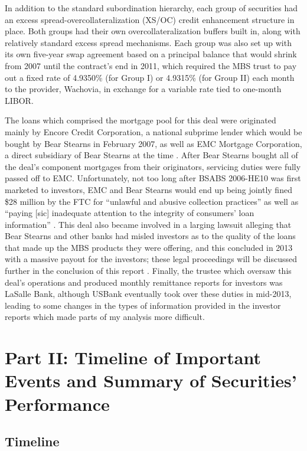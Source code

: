 \documentclass[12pt]{article}
\begin{document}
In addition to the standard subordination hierarchy, each group of securities had an excess spread-overcollateralization (XS/OC) credit enhancement structure in place. Both groups had their own overcollateralization buffers built in, along with relatively standard excess spread mechanisms. Each group was also set up with its own five-year swap agreement based on a principal balance that would shrink from 2007 until the contract’s end in 2011, which required the MBS trust to pay out a fixed rate of 4.9350\% (for Group I) or 4.9315\% (for Group II) each month to the provider, Wachovia, in exchange for a variable rate tied to one-month LIBOR.

The loans which comprised the mortgage pool for this deal were originated mainly by Encore Credit Corporation, a national subprime lender which would be bought by Bear Stearns in February 2007, as well as EMC Mortgage Corporation, a direct subsidiary of Bear Stearns at the time \parencite{cpi09}.  After Bear Stearns bought all of the deal’s component mortgages from their originators, servicing duties were fully passed off to EMC. Unfortunately, not too long after BSABS 2006-HE10 was first marketed to investors, EMC and Bear Stearns would end up being jointly fined \$28 million by the FTC for “unlawful and abusive collection practices” as well as “paying [sic] inadequate attention to the integrity of consumers’ loan information” \parencite{ftc08}. This deal also became involved in a larging lawsuit alleging that Bear Stearns and other banks had misled investors as to the quality of the loans that made up the MBS products they were offering, and this concluded in 2013 with a massive payout for the investors; these legal proceedings will be discussed further in the conclusion of this report \parencite{doj13}. Finally, the trustee which oversaw this deal’s operations and produced monthly remittance reports for investors was LaSalle Bank, although USBank eventually took over these duties in mid-2013, leading to some changes in the types of information provided in the investor reports which made parts of my analysis more difficult.

\section*{Part II: Timeline of Important Events and Summary of Securities' Performance}

\subsection*{Timeline}
\end{document}
